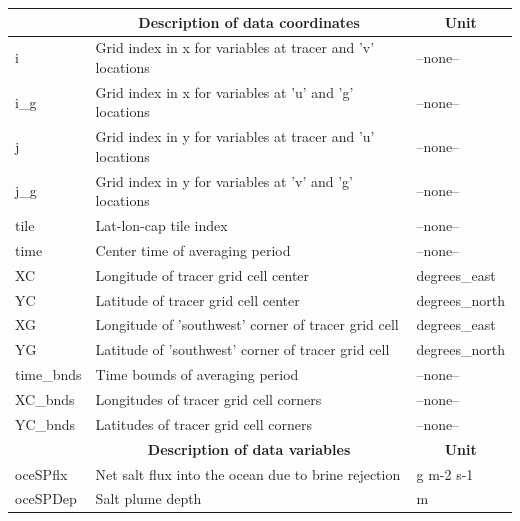 \begin{longtable}{|m{}|m{}|m{}|}
\hline \endhead \hline \endfoot
\rowcolor{lightgray} \multicolumn{1}{|c|}{\textbf{Coordinates}} & \multicolumn{1}{|c|}{\textbf{Description of data coordinates}} &  \multicolumn{1}{|c|}{\textbf{Unit}}\\ \hline
i &Grid index in x for variables at tracer and 'v' locations &--none--  \\ \hline
i\_g &Grid index in x for variables at 'u' and 'g' locations &--none--  \\ \hline
j &Grid index in y for variables at tracer and 'u' locations &--none--  \\ \hline
j\_g &Grid index in y for variables at 'v' and 'g' locations &--none--  \\ \hline
tile &Lat-lon-cap tile index &--none--  \\ \hline
time &Center time of averaging period &--none--  \\ \hline
XC &Longitude of tracer grid cell center &degrees\_east  \\ \hline
YC &Latitude of tracer grid cell center &degrees\_north  \\ \hline
XG &Longitude of 'southwest' corner of tracer grid cell &degrees\_east  \\ \hline
YG &Latitude of 'southwest' corner of tracer grid cell &degrees\_north  \\ \hline
time\_bnds &Time bounds of averaging period &--none--  \\ \hline
XC\_bnds &Longitudes of tracer grid cell corners &--none--  \\ \hline
YC\_bnds &Latitudes of tracer grid cell corners &--none--  \\ \hline
\rowcolor{lightgray} \multicolumn{1}{|c|}{\textbf{Variables}} & \multicolumn{1}{|c|}{\textbf{Description of data variables}} &  \multicolumn{1}{|c|}{\textbf{Unit}}\\ \hline
oceSPflx &Net salt flux into the ocean due to brine rejection &g m-2 s-1  \\ \hline
oceSPDep &Salt plume depth &m  \\ \hline
\end{longtable}

\newp
\pagebreak
